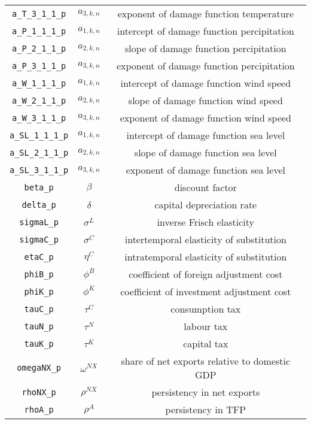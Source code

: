 \begin{center}
\begin{longtable}{ccc}
\texttt{a\_T\_3\_1\_1\_p} & ${a_{3,k,n}}$ & exponent of damage function temperature\\
\texttt{a\_P\_1\_1\_1\_p} & ${a_{1,k,n}}$ & intercept of damage function percipitation\\
\texttt{a\_P\_2\_1\_1\_p} & ${a_{2,k,n}}$ & slope of damage function percipitation\\
\texttt{a\_P\_3\_1\_1\_p} & ${a_{3,k,n}}$ & exponent of damage function percipitation\\
\texttt{a\_W\_1\_1\_1\_p} & ${a_{1,k,n}}$ & intercept of damage function wind speed\\
\texttt{a\_W\_2\_1\_1\_p} & ${a_{2,k,n}}$ & slope of damage function wind speed\\
\texttt{a\_W\_3\_1\_1\_p} & ${a_{3,k,n}}$ & exponent of damage function wind speed\\
\texttt{a\_SL\_1\_1\_1\_p} & ${a_{1,k,n}}$ & intercept of damage function sea level\\
\texttt{a\_SL\_2\_1\_1\_p} & ${a_{2,k,n}}$ & slope of damage function sea level\\
\texttt{a\_SL\_3\_1\_1\_p} & ${a_{3,k,n}}$ & exponent of damage function sea level\\
\texttt{beta\_p} & ${\beta}$ & discount factor\\
\texttt{delta\_p} & ${\delta}$ & capital depreciation rate\\
\texttt{sigmaL\_p} & ${\sigma^{L}}$ & inverse Frisch elasticity\\
\texttt{sigmaC\_p} & ${\sigma^{C}}$ & intertemporal elasticity of substitution\\
\texttt{etaC\_p} & ${\eta^{C}}$ & intratemporal elasticity of substitution\\
\texttt{phiB\_p} & ${\phi^{B}}$ & coefficient of foreign adjustment cost\\
\texttt{phiK\_p} & ${\phi^{K}}$ & coefficient of investment adjustment cost\\
\texttt{tauC\_p} & ${\tau^{C}}$ & consumption tax\\
\texttt{tauN\_p} & ${\tau^{N}}$ & labour tax\\
\texttt{tauK\_p} & ${\tau^{K}}$ & capital tax\\
\texttt{omegaNX\_p} & ${\omega^{NX}}$ & share of net exports relative to domestic GDP\\
\texttt{rhoNX\_p} & ${\rho^{NX}}$ & persistency in net exports\\
\texttt{rhoA\_p} & ${\rho^{A}}$ & persistency in TFP\\

\end{longtable}
\end{center}
